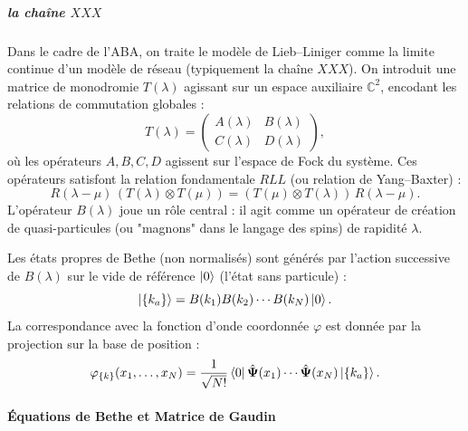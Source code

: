 \subparagraph{la chaîne $XXX$}

Dans le cadre de l'ABA, on traite le modèle de Lieb--Liniger comme la limite continue d'un modèle de réseau (typiquement la chaîne $XXX$). On introduit une matrice de monodromie $T(\lambda)$ agissant sur un espace auxiliaire $\mathbb{C}^2$, encodant les relations de commutation globales :
\begin{equation}
    T(\lambda) = \begin{pmatrix} A(\lambda) & B(\lambda) \\ C(\lambda) & D(\lambda) \end{pmatrix},
\end{equation}
où les opérateurs $A, B, C, D$ agissent sur l'espace de Fock du système. Ces opérateurs satisfont la relation fondamentale $RLL$ (ou relation de Yang--Baxter) :
\begin{equation}
    R(\lambda-\mu) \, (T(\lambda) \otimes T(\mu)) = (T(\mu) \otimes T(\lambda)) \, R(\lambda-\mu).
\end{equation}
L'opérateur $B(\lambda)$ joue un rôle central : il agit comme un opérateur de création de quasi-particules (ou "magnons" dans le langage des spins) de rapidité $\lambda$.

Les états propres de Bethe (non normalisés) sont générés par l'action successive de $B(\lambda)$ sur le vide de référence $\ket{0}$ (l'état sans particule) :
\begin{equation}
        \ket{\{k_a\}} = B(k_1)B(k_2)\cdots B(k_N) \ket{0}. 
\end{equation}
La correspondance avec la fonction d'onde coordonnée $\varphi$ est donnée par la projection sur la base de position :
\begin{equation}
    \varphi_{\{k\}}(x_1,\ldots,x_N) = \frac{1}{\sqrt{N!}} \bra{0} \hat{\bm{\Psi}}(x_1)\cdots\hat{\bm{\Psi}}(x_N) \ket{\{k_a\}}.
\end{equation}

\paragraph{Équations de Bethe et Matrice de Gaudin}

